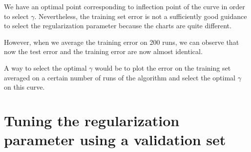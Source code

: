 \documentclass{article} %
\begin{document}
We have an optimal point corresponding to inflection point of the curve in order to select $\gamma$. Nevertheless, the training set error is not a sufficiently good guidance to select the regularization parameter because the charts are quite different. 

However, when we average the training error on 200 runs, we can observe that now the test error and the training error are now almost identical.

A way to select the optimal $\gamma$ would be to plot the error on the training set averaged on a certain number of runs of the algorithm and select the optimal $\gamma$ on this curve. 


\section{Tuning the regularization parameter using a validation set}
\end{document}
